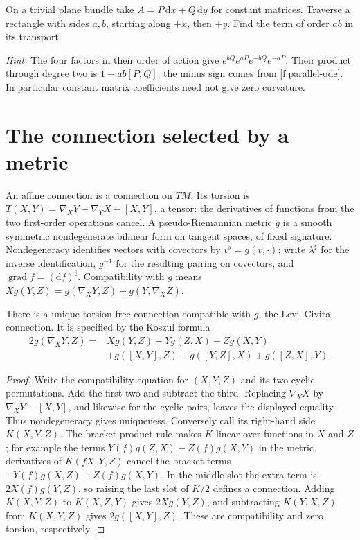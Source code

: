 \begin{exercise}
On a trivial plane bundle take $A=P\,\mathrm dx+Q\,\mathrm dy$ for constant matrices. Traverse a rectangle with sides $a,b$, starting along $+x$, then $+y$. Find the term of order $ab$ in its transport.

\emph{Hint.} The four factors in their order of action give $e^{bQ}e^{aP}e^{-bQ}e^{-aP}$. Their product through degree two is $1-ab[P,Q]$; the minus sign comes from \eqref{f:parallel-ode}. In particular constant matrix coefficients need not give zero curvature.
\end{exercise}

\section{The connection selected by a metric}

An affine connection is a connection on $TM$. Its torsion is $T(X,Y)=\nabla_XY-\nabla_YX-[X,Y]$, a tensor: the derivatives of functions from the two first-order operations cancel. A pseudo-Riemannian metric $g$ is a smooth symmetric nondegenerate bilinear form on tangent spaces, of fixed signature. Nondegeneracy identifies vectors with covectors by $v^\flat=g(v,\cdot)$; write $\lambda^\sharp$ for the inverse identification, $g^{-1}$ for the resulting pairing on covectors, and $\operatorname{grad} f=(\mathrm df)^\sharp$. Compatibility with $g$ means $Xg(Y,Z)=g(\nabla_XY,Z)+g(Y,\nabla_XZ)$.

\begin{theorem}
There is a unique torsion-free connection compatible with $g$, the Levi--Civita connection.\label{f:levi-civita} It is specified by the Koszul formula
\begin{align*}
 2g(\nabla_XY,Z)={}&Xg(Y,Z)+Yg(Z,X)-Zg(X,Y)\\
 &+g([X,Y],Z)-g([Y,Z],X)+g([Z,X],Y).
\end{align*}
\end{theorem}
\begin{proof}
Write the compatibility equation for $(X,Y,Z)$ and its two cyclic permutations. Add the first two and subtract the third. Replacing $\nabla_YX$ by $\nabla_XY-[X,Y]$, and likewise for the cyclic pairs, leaves the displayed equality. Thus nondegeneracy gives uniqueness. Conversely call its right-hand side $K(X,Y,Z)$. The bracket product rule makes $K$ linear over functions in $X$ and $Z$; for example the terms $Y(f)g(Z,X)-Z(f)g(X,Y)$ in the metric derivatives of $K(fX,Y,Z)$ cancel the bracket terms $-Y(f)g(X,Z)+Z(f)g(X,Y)$. In the middle slot the extra term is $2X(f)g(Y,Z)$, so raising the last slot of $K/2$ defines a connection. Adding $K(X,Y,Z)$ to $K(X,Z,Y)$ gives $2Xg(Y,Z)$, and subtracting $K(Y,X,Z)$ from $K(X,Y,Z)$ gives $2g([X,Y],Z)$. These are compatibility and zero torsion, respectively.
\end{proof}

